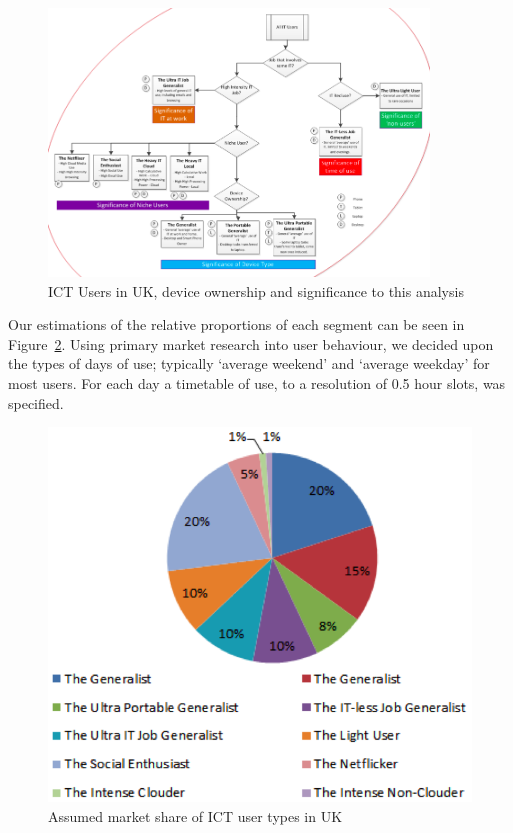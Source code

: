 \documentclass[conference]{IEEEtran}
\begin{document}
\begin{figure}[!ht]
\centering
\includegraphics[width=0.9\textwidth]{images/ukitusers_ownership_signif.png}
\caption{ICT Users in UK, device ownership and significance to this analysis}
\label{fig:itusersuk} 
\end{figure}

Our estimations of the relative proportions of each segment can be
seen in Figure~\ref{fig:marketshare}.  Using primary market research
into user behaviour, we decided upon the types of days of use;
typically `average weekend' and `average weekday' for most users. For
each day a timetable of use, to a resolution of 0.5 hour slots, was
specified.

\begin{figure}[!ht]
\centering
\includegraphics[width=0.9\columnwidth]{images/ukitusers_marketshare.png}
\caption{Assumed market share of ICT user types in UK}
\label{fig:marketshare} 
\end{figure}
\end{document}
